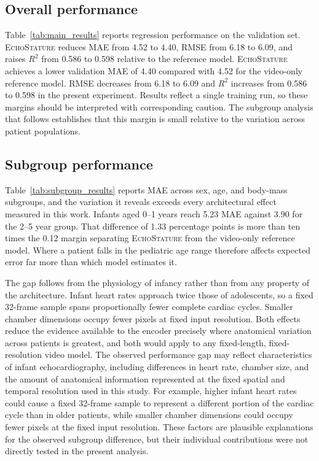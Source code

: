 \documentclass{ws-procs11x85}
\begin{document}
\subsection{Overall performance}

Table~\ref{tab:main_results} reports regression performance on the validation set.
{\color{blue}\textsc{EchoStature} reduces MAE from 4.52 to 4.40, RMSE from 6.18 to 6.09, and raises $R^2$ from 0.586 to 0.598 relative to the reference model.} {\color{red}\textsc{EchoStature} achieves a lower validation MAE of 4.40 compared with 4.52
for the video-only reference model. RMSE decreases from 6.18 to 6.09 and
$R^2$ increases from 0.586 to 0.598 in the present experiment.}
Results reflect a single training run, so these margins should be interpreted with corresponding caution.
The subgroup analysis that follows establishes that this margin is small relative to the variation across patient populations.

\subsection{Subgroup performance}

Table~\ref{tab:subgroup_results} reports MAE across sex, age, and body-mass subgroups, and the variation it reveals exceeds every architectural effect measured in this work.
Infants aged 0--1 years reach 5.23 MAE against 3.90 for the 2--5 year group.
That difference of 1.33 percentage points is more than ten times the 0.12 margin separating \textsc{EchoStature} from the video-only reference model.
Where a patient falls in the pediatric age range therefore affects expected error far more than which model estimates it.

{\color{blue}The gap follows from the physiology of infancy rather than from any property of the architecture. Infant heart rates approach twice those of adolescents, so a fixed 32-frame sample spans proportionally fewer complete cardiac cycles. Smaller chamber dimensions occupy fewer pixels at fixed input resolution. Both effects reduce the evidence available to the encoder precisely where anatomical variation across patients is greatest, and both would apply to any fixed-length, fixed-resolution video model.}
{\color{red}The observed performance gap may reflect characteristics of infant
echocardiography, including differences in heart rate, chamber size, and
the amount of anatomical information represented at the fixed spatial and
temporal resolution used in this study. For example, higher infant heart
rates could cause a fixed 32-frame sample to represent a different portion
of the cardiac cycle than in older patients, while smaller chamber
dimensions could occupy fewer pixels at the fixed input resolution. These
factors are plausible explanations for the observed subgroup difference,
but their individual contributions were not directly tested in the present
analysis.}
\end{document}
